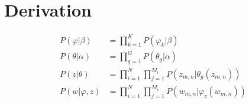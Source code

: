 \documentclass[12pt,a4paper]{amsart}
\begin{document}
\section{Derivation}
\begin{align}
P(\varphi | \beta) &= \prod\limits_{k=1}^K P(\varphi_k|\beta)\\
P(\theta | \alpha) &= \prod\limits_{g=1}^G P(\theta_g|\alpha)\\
P(z | \theta) &= \prod\limits_{i=1}^N \prod\limits_{j=1}^{M_i} P(z_{m,n}|\theta_g(z_{m,n}))\\
P(w | \varphi, z) &= \prod\limits_{i=1}^N \prod\limits_{j=1}^{M_i} P(w_{m,n}|\varphi_z(w_{m,n}))
\end{align}


\end{document}
